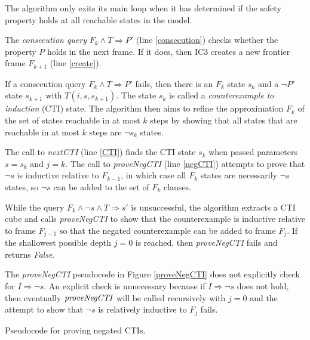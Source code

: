 \documentclass[12pt,a4paper,twoside,openright]{report}
\begin{document}
{{%
The algorithm only exits its main loop when it has determined if the
safety property holds at all reachable states in the model.

The \emph{consecution query} $F_k \wedge T \Rightarrow P'$ (line \ref{consecution})
checks whether the property $P$ holds in the next
frame. If it does, then IC3 creates a new
frontier frame $F_{k + 1}$ (line \ref{create}).

If a consecution query $F_k \wedge T \Rightarrow P'$ fails, then
there is an $F_k$ state $s_k$ and a $\neg P'$ state $s_{k + 1}$ with $T(i,s,s_{k + 1})$.
The state $s_k$ is called a \emph{counterexample to induction} (CTI) state.
The algorithm then aims to refine the approximation $F_k$ of the set of states
reachable in at most $k$ steps by showing that all states that are
reachable in at most $k$ steps are $\neg s_k$ states.

The call to {\it nextCTI} (line \ref{CTI}) finds the CTI
state $s_k$ when passed parameters $s = s_k$ and $j = k$.
The call to {\it proveNegCTI} (line \ref{negCTI})
attempts to prove that $\neg s$ is inductive relative to $F_{k - 1}$,
in which case all $F_k$ states are necessarily $\neg s$ states, so $\neg s$ can
be added to the set of $F_k$ clauses.

While the query
$F_k \wedge \neg s \wedge T \Rightarrow s'$ is unsuccessful,
the algorithm extracts a CTI cube and
calls {\it proveNegCTI} to show that the counterexample is
inductive relative to frame $F_{j - 1}$ so that the negated
counterexample can be added to frame $F_j$.
If the shallowest possible depth $j = 0$ is reached, then
{\it proveNegCTI} fails and returns {\it False}.

The {\it proveNegCTI} pseudocode in Figure \ref{proveNegCTI}
does not explicitly check for $I \Rightarrow
\neg s$. An explicit check is unnecessary because if
$I \Rightarrow \neg s$ does not hold, then eventually ${\it proveNegCTI}$
will be called recursively with $j = 0$ and the attempt to show that
$\neg s$ is relatively inductive to $F_j$ fails.

\begin{algorithm}[t]
\DontPrintSemicolon
{}
\caption{Pseudocode for proving negated CTIs.}
\label{proveNegCTI}
\end{algorithm}

}}
\end{document}
